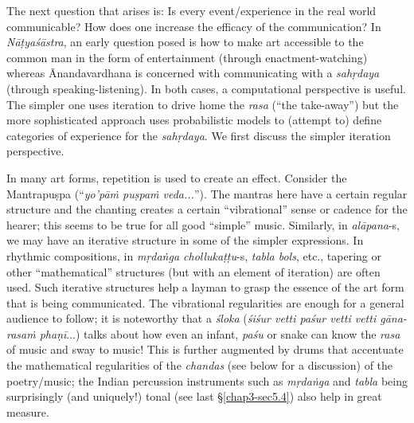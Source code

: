 The next question that arises is: Is every event/experience in the real world communicable? How does one increase the efficacy of the communication? In \textsl{Nāṭyaśāstra}, an early question posed is how to make art accessible to the common man in the form of entertainment (through enactment-watching) whereas Ānandavardhana is concerned with communicating with a \textsl{sahṛdaya} (through speaking-listening). In both cases, a computational perspective is useful. The simpler one uses iteration to drive home the \textsl{rasa} (“the take-away”) but the more sophisticated approach uses probabilistic models to (attempt to) define categories of experience for the \textsl{sahṛdaya}. We first discuss the simpler iteration perspective. 

In many art forms, repetition is used to create an effect. Consider the Mantrapuṣpa (“\textsl{yo’pāṁ puṣpaṁ veda...}”). The mantras here have a certain regular structure and the chanting creates a certain “vibrational” sense or cadence for the hearer; this seems to be true for all good “simple” music. Similarly, in \textsl{alāpana}-s, we may have an iterative structure in some of the simpler expressions. In rhythmic compositions, in \textsl{mṛdaṅga chollukaṭṭu}-s, \textsl{tabla bols}, etc., tapering or other “mathematical” structures (but with an element of iteration) are often used. Such iterative structures help a layman to grasp the essence of the art form that is being communicated. The vibrational regularities are enough for a general audience to follow; it is noteworthy that a \textsl{śloka} (\textsl{śiśur vetti paśur vetti vetti gāna-rasaṁ phaṇī}...) talks about how even an infant, \textsl{paśu} or snake can know the \textsl{rasa} of music and sway to music! This is further augmented by drums that accentuate the mathematical regularities of the \textsl{chandas} (see below for a discussion) of the poetry/music; the Indian percussion instruments such as \textsl{mṛdaṅga} and \textsl{tabla} being surprisingly (and uniquely!) tonal (see last \S\ref{chap3-sec5.4}) also help in great measure. 
\vskip 2pt

